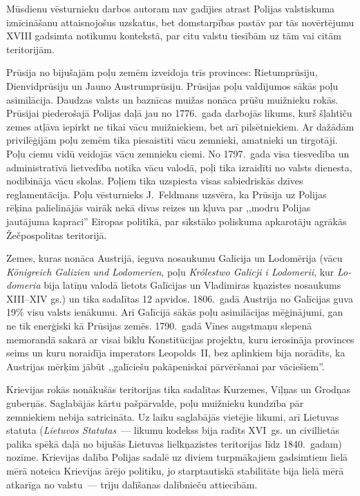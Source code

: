 \documentclass[twoside,a5paper,12pt,fleqn,openany]{extbook}
\newcommand{\pltxti}[1]{\textit{\textpolish{#1}}}
\newcommand{\detxti}[1]{\textit{\textgerman{#1}}}
\newcommand{\lttxti}[1]{\textit{\textlithuanian{#1}}}
\newcommand{\latxti}[1]{\textit{\textlatin{#1}}}
\begin{document}
Mūsdienu vēsturnieku darbos autoram nav gadījies atrast Polijas valstiskuma iznīcināšanu attaisnojošus uzskatus, bet domstarpības pastāv par tās novērtējumu XVIII gadsimta notikumu kontekstā, par citu valstu tiesībām uz tām vai citām teritorijām.

Prūsija no bijušajām poļu zemēm izveidoja trīs provinces: Rietumprūsiju, Dienvidprūsiju un Jauno Austrumprūsiju. Prūsijas poļu valdījumos sākās poļu asimilācija. Daudzas valsts un baznīcas muižas nonāca prūšu muižnieku rokās. Prūsijai piederošajā Polijas daļā jau no 1776.~gada darbojās likums, kurš šļahtiču zemes atļāva iepirkt ne tikai vācu muižniekiem, bet arī pilsētniekiem. Ar dažādām privilēģijām poļu zemēm tika piesaistīti vācu zemnieki, amatnieki un tirgotāji. Poļu ciemu vidū veidojās vācu zemnieku ciemi. No 1797.~gada visa tiesvedība un administratīvā lietvedība notika vācu valodā, poļi tika izraidīti no valsts dienesta, nodibināja vācu skolas. Poļiem tika uzspiesta visas sabiedriskās dzīves reglamentācija. Poļu vēsturnieks J.~Feldmans uzsvēra, ka Prūsija uz Polijas rēķina palielinājās vairāk nekā divas reizes un kļuva par ,,modru Polijas jautājuma kapraci'' Eiropas politikā, par sīkstāko poliskuma apkarotāju agrākās Žečpospolitas teritorijā.

Zemes, kuras nonāca Austrijā, ieguva nosaukumu Galīcija un Lodomērija (vācu \detxti{Königreich Galizien und Lodomerien}, poļu \pltxti{Królestwo Galicji i Lodomerii}, kur \latxti{Lodomeria} bija latīņu valodā lietots Galīcijas un Vladimiras kņazistes nosaukums XIII--XIV gs.) un tika sadalītas 12 apvidos. 1806.~gadā Austrija no Galīcijas guva 19\% visu valsts ienākumu. Arī Galīcijā sākās poļu asimilācijas mēģinājumi, gan ne tik enerģiski kā Prūsijas zemēs. 1790.~gadā Vīnes augstmaņu slepenā memorandā sakarā ar visai biklu Konstitūcijas projektu, kuru ierosināja provinces seims un kuru noraidīja imperators Leopolds~II, bez aplinkiem bija norādīts, ka Austrijas mērķim jābūt ,,galīciešu pakāpeniskai pārvēršanai par vāciešiem''.

Krievijas rokās nonākušās teritorijas tika sadalītas Kurzemes, Viļņas un Grodņas guberņās. Saglabājās kārtu pašpārvalde, poļu muižnieku kundzība pār zemniekiem nebija satricināta. Uz laiku saglabājās vietējie likumi, arī Lietuvas statuta (\lttxti{Lietuvos Statutas}~--- likumu kodekss bija radīts XVI~gs. un civillietās palika spēkā daļā no bijušās Lietuvas lielkņazistes teritorijas līdz 1840.~gadam) nozīme. Krievijas dalība Polijas sadalē uz diviem turpmākajiem gadsimtiem lielā mērā noteica Krievijas ārējo politiku, jo starptautiskā stabilitāte bija lielā mērā atkarīga no valstu~--- triju dalīšanas dalībnieču attiecībām.
\end{document}
